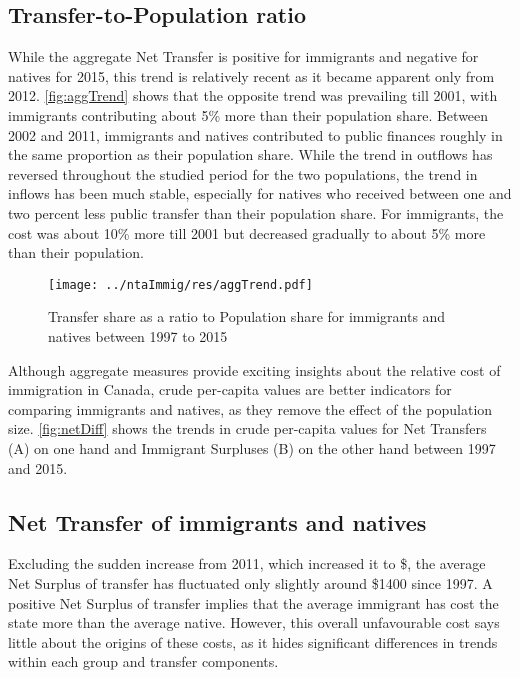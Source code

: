 \subsection{Transfer-to-Population ratio}
While the aggregate Net Transfer is positive for immigrants and negative for natives for 2015, this trend is relatively recent as it became apparent only from 2012.
\autoref{fig:aggTrend} shows that the opposite trend was prevailing till 2001, with immigrants contributing about 5\% more than their population share.
Between 2002 and 2011, immigrants and natives contributed to public finances roughly in the same proportion as their population share.
While the trend in outflows has reversed throughout the studied period for the two populations, the trend in inflows has been much stable, especially for natives who received between one and two percent less public transfer than their population share.
For immigrants, the cost was about 10\% more till 2001 but decreased gradually to about 5\% more than their population.

  \begin{figure}[H]%
    \caption{Transfer share as a ratio to Population share for immigrants and natives between 1997 to 2015}
    \texttt{[image: ../ntaImmig/res/aggTrend.pdf]}%
    \label{fig:aggTrend}%
  \end{figure}%

Although aggregate measures provide exciting insights about the relative cost of immigration in Canada, crude per-capita values are better indicators for comparing immigrants and natives, as they remove the effect of the population size. \autoref{fig:netDiff} shows the trends in crude per-capita values for Net Transfers (A) on one hand and Immigrant Surpluses (B) on the other hand between 1997 and 2015.

\subsection{Net Transfer of immigrants and natives}
Excluding the sudden increase from 2011, which increased it to \$, the average Net Surplus of transfer has fluctuated only slightly around \$1400 since 1997.
A positive Net Surplus of transfer implies that the average immigrant has cost the state more than the average native.
However, this overall unfavourable cost says little about the origins of these costs, as it hides significant differences in trends within each group and transfer components.

